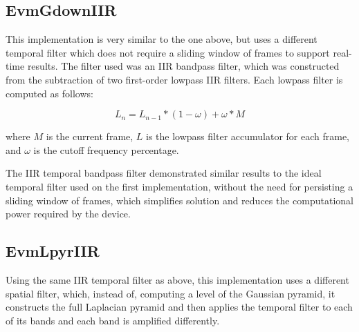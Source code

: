 \subsection{EvmGdownIIR} \label{sec:impl:evm:gdowniir}

This implementation is very similar to the one above, but uses a different
temporal filter which does not require a sliding window of frames to support
real-time results. The filter used was an IIR bandpass filter, which was
constructed from the subtraction of two first-order lowpass IIR filters. Each
lowpass filter is computed as follows:

\begin{equation}
  L_n = L_{n-1} * (1 - \omega) + \omega * M
\end{equation}

where $M$ is the current frame, $L$ is the lowpass filter accumulator for
each frame, and $\omega$ is the cutoff frequency percentage.

The IIR temporal bandpass filter demonstrated similar results to the ideal
temporal filter used on the first implementation, without the need for
persisting a sliding window of frames, which simplifies solution and reduces
the computational power required by the device.

\subsection{EvmLpyrIIR} \label{sec:impl:evm:lpyriir}


Using the same IIR temporal filter as above, this implementation uses
a different spatial filter, which, instead of, computing a level of the
Gaussian pyramid, it constructs the full Laplacian pyramid and then applies
the temporal filter to each of its bands and each band is amplified differently.


